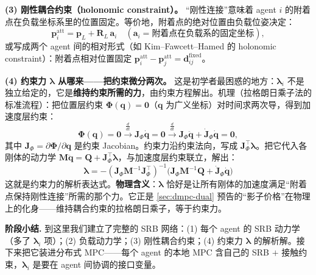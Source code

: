 \textbf{(3) 刚性耦合约束（holonomic constraint）。} “刚性连接”意味着 agent $i$ 的附着点在负载坐标系里的位置固定。等价地，附着点的绝对位置由负载位姿决定：
\begin{equation}
  \mathbf{p}_i^{\text{att}} = \mathbf{p}_L + \mathbf{R}_L\,\mathbf{a}_i \quad(\mathbf{a}_i=\text{附着点在负载系的固定坐标}),
  \label{eq:dmpc-holonomic}
\end{equation}
或写成两个 agent 间的相对形式（如 Kim--Fawcett--Hamed\cite{kim2023layered} 的 holonomic constraint）：附着点相对位置固定 $\mathbf{p}_i^{\text{att}}-\mathbf{p}_j^{\text{att}}=\mathbf{d}_{ij}^{\text{fixed}}$。

\textbf{(4) 约束力 $\boldsymbol{\lambda}$ 从哪来——把约束微分两次。} 这是初学者最困惑的地方：$\boldsymbol{\lambda}_i$ 不是独立给定的，它是\textbf{维持约束所需的力}，由约束方程解出。机理（拉格朗日乘子法的标准流程）：把位置层约束 $\boldsymbol{\Phi}(\mathbf{q})=\mathbf{0}$（$\mathbf{q}$ 为广义坐标）对时间求两次导，得到加速度层约束：
\begin{equation}
  \boldsymbol{\Phi}(\mathbf{q})=\mathbf{0} \xrightarrow{\frac{d}{dt}} \mathbf{J}_\Phi\dot{\mathbf{q}}=\mathbf{0} \xrightarrow{\frac{d}{dt}} \mathbf{J}_\Phi\ddot{\mathbf{q}}+\dot{\mathbf{J}}_\Phi\dot{\mathbf{q}}=\mathbf{0},
  \label{eq:dmpc-constraint-diff}
\end{equation}
其中 $\mathbf{J}_\Phi=\partial\boldsymbol{\Phi}/\partial\mathbf{q}$ 是约束 Jacobian。约束力沿约束法向，写成 $\mathbf{J}_\Phi^\top\boldsymbol{\lambda}$。把它代入各刚体的动力学 $\mathbf{M}\ddot{\mathbf{q}}=\mathbf{Q}+\mathbf{J}_\Phi^\top\boldsymbol{\lambda}$，与加速度层约束联立，解出：
\begin{equation}
  \boxed{\ \boldsymbol{\lambda}=-(\mathbf{J}_\Phi \mathbf{M}^{-1}\mathbf{J}_\Phi^\top)^{-1}\big(\mathbf{J}_\Phi \mathbf{M}^{-1}\mathbf{Q}+\dot{\mathbf{J}}_\Phi\dot{\mathbf{q}}\big)\ }
  \label{eq:dmpc-constraint-force}
\end{equation}
这就是约束力的解析表达式。\textbf{物理含义}：$\boldsymbol{\lambda}$ 恰好是让所有刚体的加速度满足“附着点保持刚性连接”所需的那个力。它正是 \cref{sec:dmpc-dual} 预告的“影子价格”在物理上的化身——维持耦合约束的拉格朗日乘子，等于约束力。

\begin{note}
\textbf{阶段小结.}\;
到这里我们建立了完整的 SRB 网络：(1) 每个 agent 的 SRB 动力学（多了 $\boldsymbol{\lambda}_i$ 项）；(2) 负载动力学；(3) 刚性耦合约束；(4) 约束力 $\boldsymbol{\lambda}$ 的解析解。接下来把它装进分布式 MPC——每个 agent 的本地 MPC 含自己的 SRB $+$ 接触约束，$\boldsymbol{\lambda}_i$ 是要在 agent 间协调的接口变量。
\end{note}

